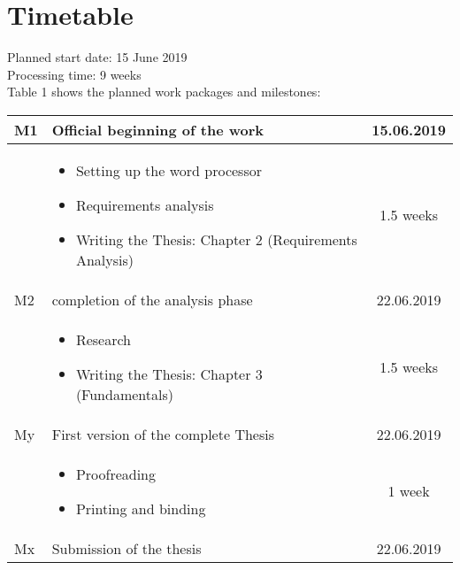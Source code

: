 \section{Timetable}
\label{sec:timetable}
\renewcommand{\arraystretch}{1.5}

Planned start date: 15 June 2019
\\
Processing time: 9 weeks
\\
Table 1 shows the planned work packages and milestones:
\\

	\begin{flushleft}
	    \begin{tabular}{ | l | p{10cm} | c |}
	    \hline
	    M1 & Official beginning of the work & 15.06.2019 \\ 
	    \hline
	    & \begin{itemize}
            \item Setting up the word processor
            \item Requirements analysis
            \item Writing the Thesis: Chapter 2 (Requirements Analysis)
	        \end{itemize} & 1.5 weeks \\
		\hline
		M2 & completion of the analysis phase & 22.06.2019\\ 
	    \hline
	    & \begin{itemize}
            \item Research
            \item Writing the Thesis: Chapter 3 (Fundamentals)
	        \end{itemize} & 1.5 weeks \\
	    \hline
		My & First version of the complete Thesis & 22.06.2019 \\ 
	    \hline
	    & \begin{itemize}
	    	\item Proofreading
	    	\item Printing and binding
	    \end{itemize} & 1 week \\
		\hline
		Mx & Submission of the thesis & 22.06.2019 \\ 
		\hline
		\end{tabular}
	\end{flushleft}
